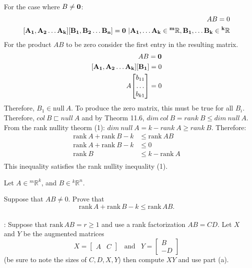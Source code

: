 \documentclass[10pt]{article}
\newcommand{\noin}{\noindent}
\begin{document}
{{\begin{align*}
	\end{align*}
	For the case where $B \neq \bf{0}$:
	\begin{align*}
		AB = 0 \\
		\bf[A_1, A_2 \dots A_k][B_1, B_2 \dots B_n] = {\bf0}\ |  {A_1, \dots A_k} \in {^m}\mathbb R, {B_1, \dots B_k} \in {^k}\mathbb R\\
	\end{align*}
	For the product ${AB}$ to be zero consider the first entry in the resulting matrix.
	\begin{align*}
		AB = \bf{0} \\
		{\bf{[A_1, A_2 \dots A_k][B_1]}} = 0 \\
		{A} {\bf \begin{bmatrix}
			b_{11} \\
			\dots \\
			b_{k1}
		\end{bmatrix}} = 0 \\
	\end{align*}
	Therefore, $B_1 \in \mathrm{null}\ A$. To produce the zero matrix, this must be true for all $B_i$. Therefore, $col\ B \sqsubset null \ A$ and by Theorm 11.6, $dim\ col\ B = rank\ B \leq dim \ null \ A$. 
	From the rank nullity theorm (1): $dim\ null\ A = k - rank\ A \geq rank\ B$. Therefore:
	\begin{align*}
		\mathrm{rank}\ {A} + \mathrm{rank}\ B - k &\leq \mathrm{rank}\ AB \\
		\mathrm{rank}\ {A} + \mathrm{rank}\ B - k &\leq 0 \\
		\mathrm{rank}\ B &\leq k - \mathrm{rank}\ {{A}}\\
	\end{align*}
	This inequality satisfies the rank nullity inequality (1).
	}
}

\pagebreak


\noin{1.} Let $A\in {^m}\mathbb R^k$,  and $B\in {^k}\mathbb R^n$.
\vspace{20pt}


\noin{(b)} Suppose that $AB\neq0$.  Prove that 
$$\mathrm{rank}\, A + \mathrm{rank}\, B - k \leq \mathrm{rank}\, AB.$$\\

\noin{\it Hint}:  Suppose that $\mathrm{rank}\, AB=r\ge 1$ and use a rank factorization $AB=CD$.  Let $X$ and $Y$ be the augmented matrices 
$$X=\begin{bmatrix} A & C \end{bmatrix} \,\,\, \mbox{ and } \,\,\, Y=\begin{bmatrix} B\\ -D \end{bmatrix}$$
(be sure to note the sizes of $C, D,  X, Y$) then compute $XY$ and use part (a).
\end{document}
